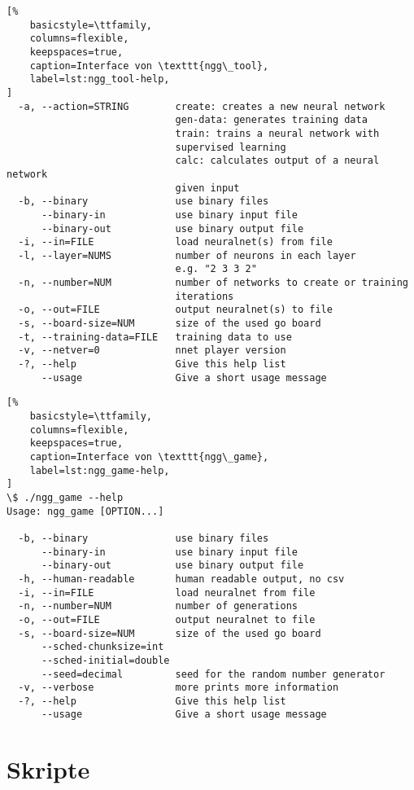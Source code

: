 \begin{appendices}
\begin{lstlisting}[%
    basicstyle=\ttfamily,
    columns=flexible,
    keepspaces=true,
    caption=Interface von \texttt{ngg\_tool},
    label=lst:ngg_tool-help,
]
  -a, --action=STRING        create: creates a new neural network
                             gen-data: generates training data
                             train: trains a neural network with
                             supervised learning
                             calc: calculates output of a neural network
                             given input
  -b, --binary               use binary files
      --binary-in            use binary input file
      --binary-out           use binary output file
  -i, --in=FILE              load neuralnet(s) from file
  -l, --layer=NUMS           number of neurons in each layer
                             e.g. "2 3 3 2"
  -n, --number=NUM           number of networks to create or training
                             iterations
  -o, --out=FILE             output neuralnet(s) to file
  -s, --board-size=NUM       size of the used go board
  -t, --training-data=FILE   training data to use
  -v, --netver=0             nnet player version
  -?, --help                 Give this help list
      --usage                Give a short usage message
\end{lstlisting}

\begin{lstlisting}[%
    basicstyle=\ttfamily,
    columns=flexible,
    keepspaces=true,
    caption=Interface von \texttt{ngg\_game},
    label=lst:ngg_game-help,
]
\$ ./ngg_game --help
Usage: ngg_game [OPTION...]

  -b, --binary               use binary files
      --binary-in            use binary input file
      --binary-out           use binary output file
  -h, --human-readable       human readable output, no csv
  -i, --in=FILE              load neuralnet from file
  -n, --number=NUM           number of generations
  -o, --out=FILE             output neuralnet to file
  -s, --board-size=NUM       size of the used go board
      --sched-chunksize=int
      --sched-initial=double
      --seed=decimal         seed for the random number generator
  -v, --verbose              more prints more information
  -?, --help                 Give this help list
      --usage                Give a short usage message
\end{lstlisting}


\section{Skripte}



\end{appendices}
